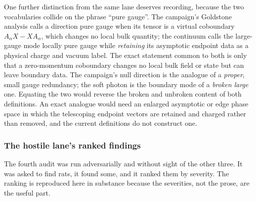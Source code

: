 \noindent One further distinction from the same lane deserves recording,
because the two vocabularies collide on the phrase ``pure gauge''. The
campaign's Goldstone analysis calls a direction pure gauge when its tensor is a
virtual coboundary $A_\alpha X-XA_\alpha$, which changes no local bulk quantity;
the continuum calls the large-gauge mode locally pure gauge while
\emph{retaining} its asymptotic endpoint data as a physical charge and vacuum
label. The exact statement common to both is only that a zero-momentum
coboundary changes no local bulk field or state but can leave boundary data.
The campaign's null direction is the analogue of a \emph{proper}, small gauge
redundancy; the soft photon is the boundary mode of a \emph{broken large} one.
Equating the two would reverse the broken and unbroken content of both
definitions. An exact analogue would need an enlarged asymptotic or edge phase
space in which the telescoping endpoint vectors are retained and charged rather
than removed, and the current definitions do not construct one.

\subsubsection*{The hostile lane's ranked findings}

The fourth audit was run adversarially and without sight of the other three. It
was asked to find rats, it found some, and it ranked them by severity. The
ranking is reproduced here in substance because the severities, not the prose,
are the useful part.

